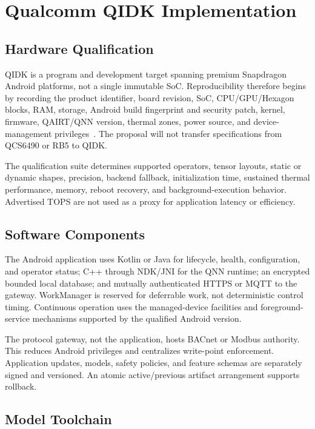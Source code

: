\section{Qualcomm QIDK Implementation}

\subsection{Hardware Qualification}

QIDK is a program and development target spanning premium Snapdragon Android platforms, not a single immutable SoC. Reproducibility therefore begins by recording the product identifier, board revision, SoC, CPU/GPU/Hexagon blocks, RAM, storage, Android build fingerprint and security patch, kernel, firmware, QAIRT/QNN version, thermal zones, power source, and device-management privileges~\cite{qualcomm_qidk}. The proposal will not transfer specifications from QCS6490 or RB5 to QIDK.

The qualification suite determines supported operators, tensor layouts, static or dynamic shapes, precision, backend fallback, initialization time, sustained thermal performance, memory, reboot recovery, and background-execution behavior. Advertised TOPS are not used as a proxy for application latency or efficiency.

\subsection{Software Components}

The Android application uses Kotlin or Java for lifecycle, health, configuration, and operator status; C++ through NDK/JNI for the QNN runtime; an encrypted bounded local database; and mutually authenticated HTTPS or MQTT to the gateway. WorkManager is reserved for deferrable work, not deterministic control timing. Continuous operation uses the managed-device facilities and foreground-service mechanisms supported by the qualified Android version.

The protocol gateway, not the application, hosts BACnet or Modbus authority. This reduces Android privileges and centralizes write-point enforcement. Application updates, models, safety policies, and feature schemas are separately signed and versioned. An atomic active/previous artifact arrangement supports rollback.

\subsection{Model Toolchain}

